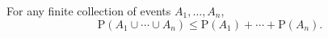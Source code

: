 For any finite collection of events $A_1, \ldots, A_n$,
$$\text{P}(A_1 \cup \cdots \cup A_n) \leq \text{P}(A_1) + \cdots + \text{P}(A_n).$$
